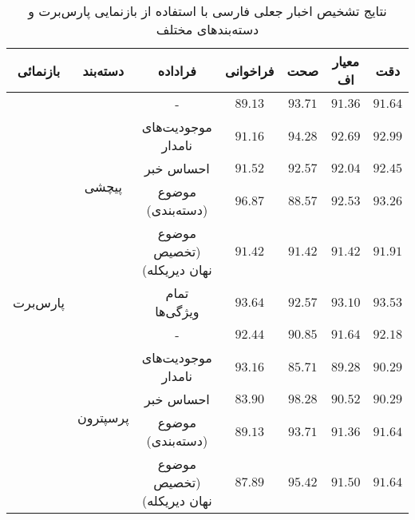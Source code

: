 \begin{table}[!t]
	\caption{نتایج تشخیص اخبار جعلی فارسی با استفاده از بازنمایی پارس‌برت و دسته‌بندهای مختلف}
	\label{table.results_meta}
	\begin{center}
		\begin{tabular}{|c|c|c|c|c|c|c|}
			\hline
			بازنمائی & دسته‌بند & فراداده & فراخوانی & صحت & معیار اف & دقت \\
			\hline
			\hline
			\multirow{11}{*}{پارس‌برت} & \multirow{5}{*}{پیچشی}
			& - & $89.13$ & $93.71$ & $91.36$ & $91.64$ \\
			\cline{3-7}
			&  & موجودیت‌های نامدار & $91.16$& $94.28$ & $92.69$ & $92.99$ \\
		\cline{3-7}
			&  & احساس‌ خبر & $91.52$ & $92.57$ & $92.04$ & $92.45$ \\
			\cline{3-7}
			 &  & موضوع  (دسته‌بندی) & $96.87$ & $88.57$ & $92.53$ & $93.26$ \\
			\cline{3-7}
		 &  & موضوع  (تخصیص نهان دیریکله) & $91.42$ & $91.42$  & $91.42$  & $91.91$  \\
			\cline{3-7}
			&  & تمام ویژگی‌ها & $93.64$ & $92.57$ & $93.10$ & $93.53$ \\
			\cline{2-7}
			& \multirow{5}{*}{پرسپترون}
			& - & $92.44$ & $90.85$ & $91.64$ & $92.18$ \\
			\cline{3-7}
			&  &موجودیت‌های نامدار & $93.16$ & $85.71$ & $89.28$ & $90.29$ \\
			\cline{3-7}
			&  &احساس‌ خبر & $83.90$ & $98.28$ & $90.52 $ & $90.29$ \\
			\cline{3-7}
		&  & موضوع  (دسته‌بندی) & $89.13$ & $93.71$ & $91.36$ & $91.64$ \\
			\cline{3-7}
			&  & موضوع  (تخصیص نهان دیریکله)  & $87.89 $ & $95.42$ & $91.50$ & $91.64$ \\
			\hline
		\end{tabular}
	\end{center}
\end{table}